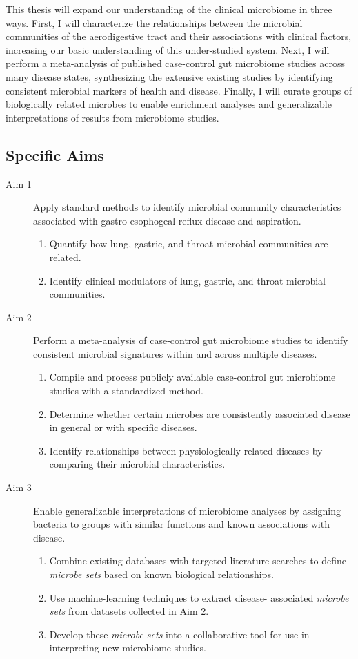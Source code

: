 \documentclass[12pt]{article}
\begin{document}
This thesis will expand our understanding of the clinical microbiome in three ways.
First, I will characterize the relationships between the microbial communities
of the aerodigestive tract and their associations with clinical factors, 
increasing our basic understanding of this under-studied system.
Next, I will perform a meta-analysis of published case-control gut microbiome studies
across many disease states, synthesizing the extensive existing studies by 
identifying consistent microbial markers of health and disease.
Finally, I will curate groups of biologically related microbes
to enable enrichment analyses and generalizable interpretations
of results from microbiome studies. 

\subsection{Specific Aims}
\begin{description}
	\item[Aim 1] Apply standard methods to identify microbial 
	community characteristics associated with gastro-esophogeal reflux 
	disease and aspiration.
	\begin{enumerate}
		\item Quantify how lung, gastric, and throat microbial 
		communities are related.
		\item Identify clinical modulators of lung, gastric, and 
		throat microbial communities.
	\end{enumerate}
	\item[Aim 2] Perform a meta-analysis of case-control gut 
	microbiome studies to identify consistent microbial signatures 
	within and across multiple diseases.
	\begin{enumerate}
		\item Compile and process publicly available case-control gut 
		microbiome studies with a standardized method.
		\item Determine whether certain microbes are consistently 
		associated disease in general or with specific diseases.
		\item Identify relationships between physiologically-related 
		diseases by comparing their microbial characteristics.
	\end{enumerate}
	\item[Aim 3] Enable generalizable interpretations of microbiome 
	analyses by assigning bacteria to groups with similar functions 
	and known associations with disease.
	\begin{enumerate}
		\item Combine existing databases with targeted literature searches 
		to define \textit{microbe sets} based on known biological 
		relationships.
		\item Use machine-learning techniques to extract disease-
		associated \textit{microbe sets} from datasets collected in Aim 2.
		\item Develop these \textit{microbe sets} into a collaborative 
		tool for use in interpreting new microbiome studies.
	\end{enumerate}
\end{description}
\newpage
\end{document}
